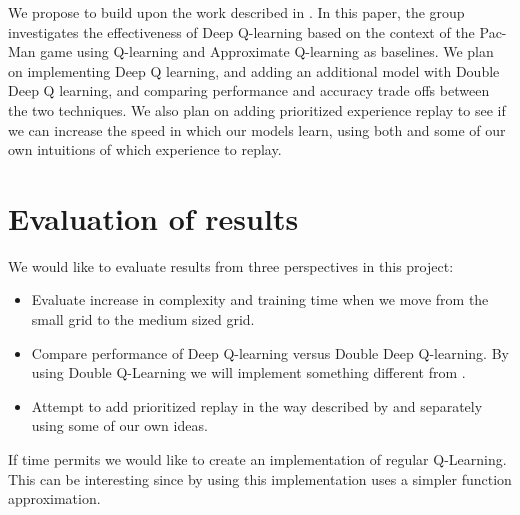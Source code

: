 \documentclass[titlepage]{article}
\begin{document}
We propose to build upon the work described in \cite{gnanasekaranreinforcement}. In this paper, the group investigates the effectiveness of Deep Q-learning based on the context of the Pac-Man game using Q-learning and Approximate Q-learning as baselines. We plan on implementing Deep Q learning, and adding an additional model with Double Deep Q learning, and comparing performance and accuracy trade offs between the two techniques. We also plan on adding prioritized experience replay to see if we can increase the speed in which our models learn, using both \cite{schaul2016prioritized} and some of our own intuitions of which experience to replay.

\section{Evaluation of results}
We would like to evaluate results from three perspectives in this project:
\begin{itemize}
  \item Evaluate increase in complexity and training time when we move from the small grid to the medium sized grid.
  \item Compare performance of Deep Q-learning versus Double Deep Q-learning. By using Double Q-Learning we will implement something different from \cite{gnanasekaranreinforcement}.
  \item Attempt to add prioritized replay in the way described by \cite{schaul2016prioritized} and separately using some of our own ideas.
\end{itemize}

If time permits we would like to create an implementation of regular Q-Learning. This can be interesting since by using this implementation uses a simpler function approximation.



\end{document}
